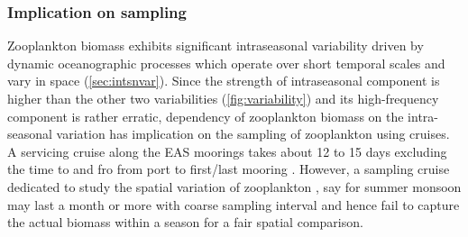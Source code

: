 \documentclass{article}
\begin{document}
    \subsubsection{Implication on sampling}  
    \label{sec:samplingimplication}
    Zooplankton biomass exhibits significant intraseasonal variability driven by dynamic oceanographic processes which operate over short temporal scales and vary in space (\cref{sec:intsnvar}). Since the strength of intraseasonal component is higher than the other two variabilities (\cref{fig:variability}) and its high-frequency component is rather erratic, dependency of zooplankton biomass on the intra-seasonal variation has implication on the sampling of zooplankton using cruises. A servicing cruise along the EAS moorings takes about 12 to 15 days excluding the time to and fro from port to first/last mooring \citep{ chaudhuri2020observed, aparna2022seasonal}. However, a sampling cruise dedicated to study the spatial variation of zooplankton \citep{madhupratap1992zooplankton,smith1998seasonal,wishner1998mesozooplankton, kidwai2000dd}, say for summer monsoon may last a month or more with coarse sampling interval and hence fail to capture the actual biomass within a season for a fair spatial comparison. 
    
\end{document}
